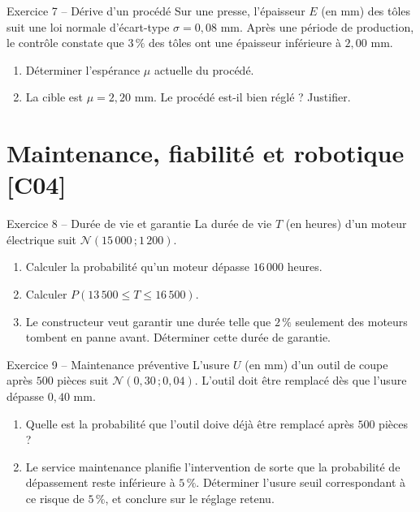 \documentclass[a4paper,11pt]{article}
\begin{document}
\begin{exo}{Exercice 7 -- Dérive d'un procédé}
Sur une presse, l'épaisseur $E$ (en mm) des tôles suit une loi normale d'écart-type $\sigma = 0{,}08$ mm. Après une période de production, le contrôle constate que $3\,\%$ des tôles ont une épaisseur inférieure à $2{,}00$ mm.
\begin{enumerate}[label=\alph*)]
  \item Déterminer l'espérance $\mu$ actuelle du procédé.
  \item La cible est $\mu = 2{,}20$ mm. Le procédé est-il bien réglé ? Justifier.
\end{enumerate}
\end{exo}

\section{Maintenance, fiabilité et robotique \hfill {\normalsize\color{uimmred}[C04]}}

\begin{exo}{Exercice 8 -- Durée de vie et garantie}
La durée de vie $T$ (en heures) d'un moteur électrique suit $\mathcal{N}(15\,000\,;1\,200)$.
\begin{enumerate}[label=\alph*)]
  \item Calculer la probabilité qu'un moteur dépasse $16\,000$ heures.
  \item Calculer $P(13\,500 \leq T \leq 16\,500)$.
  \item Le constructeur veut garantir une durée telle que $2\,\%$ seulement des moteurs tombent en panne avant. Déterminer cette durée de garantie.
\end{enumerate}
\end{exo}

\begin{exo}{Exercice 9 -- Maintenance préventive}
L'usure $U$ (en mm) d'un outil de coupe après $500$ pièces suit $\mathcal{N}(0{,}30\,;0{,}04)$. L'outil doit être remplacé dès que l'usure dépasse $0{,}40$ mm.
\begin{enumerate}[label=\alph*)]
  \item Quelle est la probabilité que l'outil doive déjà être remplacé après $500$ pièces ?
  \item Le service maintenance planifie l'intervention de sorte que la probabilité de dépassement reste inférieure à $5\,\%$. Déterminer l'usure seuil correspondant à ce risque de $5\,\%$, et conclure sur le réglage retenu.
\end{enumerate}
\end{exo}
\end{document}

